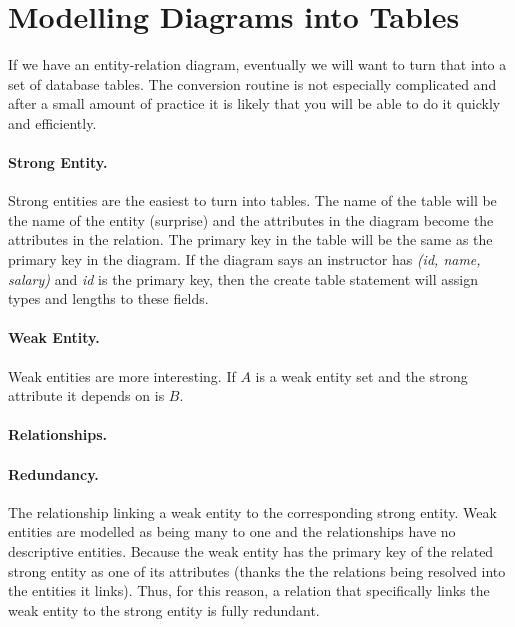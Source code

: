




\section*{Modelling Diagrams into Tables}
If we have an entity-relation diagram, eventually we will want to turn that into a set of database tables. The conversion routine is not especially complicated and after a small amount of practice it is likely that you will be able to do it quickly and efficiently.

\paragraph{Strong Entity.} Strong entities are the easiest to turn into tables. The name of the table will be the name of the entity (surprise) and the attributes in the diagram become the attributes in the relation. The primary key in the table will be the same as the primary key in the diagram. If the diagram says an instructor has \textit{(id, name, salary)} and \textit{id} is the primary key, then the create table statement will assign types and lengths to these fields. 

\paragraph{Weak Entity.} Weak entities are more interesting. If $A$ is a weak entity set and the strong attribute it depends on is $B$.

\paragraph{Relationships.}

\paragraph{Redundancy.}
The relationship linking a weak entity to the corresponding strong entity. Weak entities are modelled as being many to one and the relationships have no descriptive entities. Because the weak entity has the primary key of the related strong entity as one of its attributes (thanks the the relations being resolved into the entities it links). Thus, for this reason, a relation that specifically links the weak entity to the strong entity is fully redundant. 


